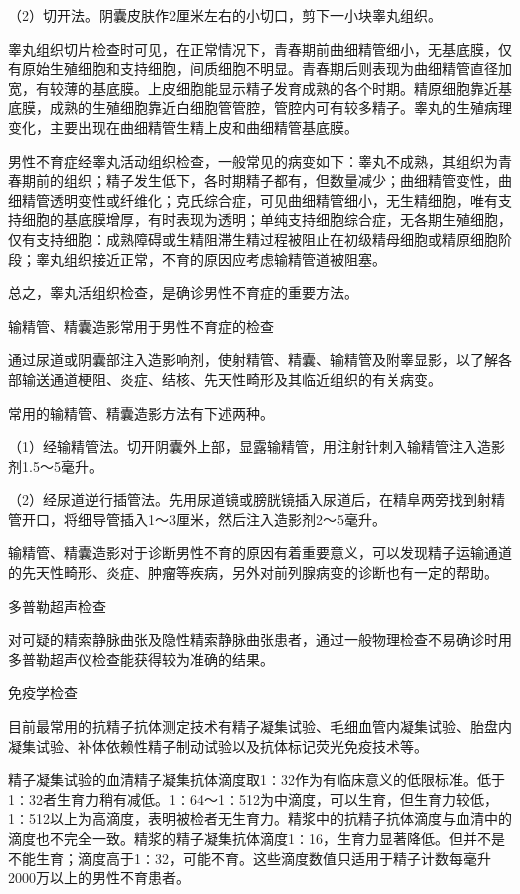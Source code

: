 \documentclass[12pt,UTF8]{ctexbook}
\begin{document}
（2）切开法。阴囊皮肤作2厘米左右的小切口，剪下一小块睾丸组织。

睾丸组织切片检查时可见，在正常情况下，青春期前曲细精管细小，无基底膜，仅有原始生殖细胞和支持细胞，间质细胞不明显。青春期后则表现为曲细精管直径加宽，有较薄的基底膜。上皮细胞能显示精子发育成熟的各个时期。精原细胞靠近基底膜，成熟的生殖细胞靠近白细胞管管腔，管腔内可有较多精子。睾丸的生殖病理变化，主要出现在曲细精管生精上皮和曲细精管基底膜。

男性不育症经睾丸活动组织检查，一般常见的病变如下：睾丸不成熟，其组织为青春期前的组织；精子发生低下，各时期精子都有，但数量减少；曲细精管变性，曲细精管透明变性或纤维化；克氏综合症，可见曲细精管细小，无生精细胞，唯有支持细胞的基底膜增厚，有时表现为透明；单纯支持细胞综合症，无各期生殖细胞，仅有支持细胞：成熟障碍或生精阻滞生精过程被阻止在初级精母细胞或精原细胞阶段；睾丸组织接近正常，不育的原因应考虑输精管道被阻塞。

总之，睾丸活组织检查，是确诊男性不育症的重要方法。

输精管、精囊造影常用于男性不育症的检查

通过尿道或阴囊部注入造影响剂，使射精管、精囊、输精管及附睾显影，以了解各部输送通道梗阻、炎症、结核、先天性畸形及其临近组织的有关病变。

常用的输精管、精囊造影方法有下述两种。

（1）经输精管法。切开阴囊外上部，显露输精管，用注射针刺入输精管注入造影剂1.5～5毫升。

（2）经尿道逆行插管法。先用尿道镜或膀胱镜插入尿道后，在精阜两旁找到射精管开口，将细导管插入1～3厘米，然后注入造影剂2～5毫升。

输精管、精囊造影对于诊断男性不育的原因有着重要意义，可以发现精子运输通道的先天性畸形、炎症、肿瘤等疾病，另外对前列腺病变的诊断也有一定的帮助。

多普勒超声检查

对可疑的精索静脉曲张及隐性精索静脉曲张患者，通过一般物理检查不易确诊时用多普勒超声仪检查能获得较为准确的结果。

免疫学检查

目前最常用的抗精子抗体测定技术有精子凝集试验、毛细血管内凝集试验、胎盘内凝集试验、补体依赖性精子制动试验以及抗体标记荧光免疫技术等。

精子凝集试验的血清精子凝集抗体滴度取1∶32作为有临床意义的低限标准。低于1∶32者生育力稍有减低。1∶64～1∶512为中滴度，可以生育，但生育力较低，1∶512以上为高滴度，表明被检者无生育力。精浆中的抗精子抗体滴度与血清中的滴度也不完全一致。精浆的精子凝集抗体滴度1∶16，生育力显著降低。但并不是不能生育；滴度高于1∶32，可能不育。这些滴度数值只适用于精子计数每毫升2000万以上的男性不育患者。
\end{document}
